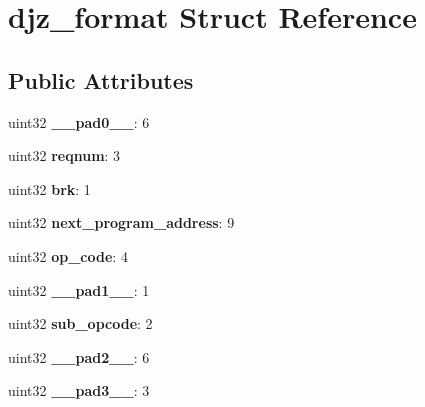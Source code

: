 \hypertarget{structdjz__format}{}\section{djz\+\_\+format Struct Reference}
\label{structdjz__format}
\subsection*{Public Attributes}
\begin{DoxyCompactItemize}
\item 
\mbox{\label{structdjz__format_ae9d09bf0a2598fa8f902639f47536712}} 
uint32 {\bfseries \+\_\+\+\_\+pad0\+\_\+\+\_\+}\+: 6
\item 
\mbox{\label{structdjz__format_ae7f9eb77ed617cd35d32a49c6d21bea3}} 
uint32 {\bfseries reqnum}\+: 3
\item 
\mbox{\label{structdjz__format_af64a53f32f6bcdcabca4caca959d6404}} 
uint32 {\bfseries brk}\+: 1
\item 
\mbox{\label{structdjz__format_ae1e8b9d5ef49581fcf077be557a3f097}} 
uint32 {\bfseries next\+\_\+program\+\_\+address}\+: 9
\item 
\mbox{\label{structdjz__format_ad18cc8155bd1d8605d259173454c9df2}} 
uint32 {\bfseries op\+\_\+code}\+: 4
\item 
\mbox{\label{structdjz__format_a89ef77d1a82e231fb0fe56073b350dad}} 
uint32 {\bfseries \+\_\+\+\_\+pad1\+\_\+\+\_\+}\+: 1
\item 
\mbox{\label{structdjz__format_a876b67b30478a276879ab560e00b8e83}} 
uint32 {\bfseries sub\+\_\+opcode}\+: 2
\item 
\mbox{\label{structdjz__format_ac83d5b0d0ec278036618f0e9f801de23}} 
uint32 {\bfseries \+\_\+\+\_\+pad2\+\_\+\+\_\+}\+: 6
\item 
\mbox{\label{structdjz__format_ac3ab4adab84d8dec0e48307ea292caa3}} 
uint32 {\bfseries \+\_\+\+\_\+pad3\+\_\+\+\_\+}\+: 3
\item 

\end{DoxyCompactItemize}
